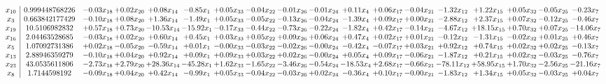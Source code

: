 \documentclass[9pt]{article}
\begin{document}
 \[\begin{array}{c| c c@{\hskip 2pt} c@{\hskip 2pt} c@{\hskip 2pt} c@{\hskip 2pt} c@{\hskip 2pt} c@{\hskip 2pt} c@{\hskip 2pt} c@{\hskip 2pt} c@{\hskip 2pt} c@{\hskip 2pt} c@{\hskip 2pt} c@{\hskip 2pt} c@{\hskip 2pt} c@{\hskip 2pt} c@{\hskip 2pt} c@{\hskip 2pt} }
 x_{10}   &  0.999448768226 & -0.03 x_{18} & +  0.02 x_{20} & +  0.08 x_{14} & -0.85 x_{1} & +  0.05 x_{33} & -0.04 x_{22} & -0.01 x_{26} & -0.01 x_{24} & +  0.11 x_{4} & +  0.06 x_{17} & -0.04 x_{21} & -1.32 x_{12} & +  1.22 x_{15} & +  0.05 x_{32} & -0.05 x_{25} & -0.23 x_{7}\\
 x_{3}   &  0.663842177429 & -0.10 x_{18} & +  0.08 x_{20} & +  1.36 x_{14} & -1.49 x_{1} & +  0.05 x_{33} & -0.05 x_{22} & -0.13 x_{26} & -0.04 x_{24} & -1.39 x_{4} & +  0.09 x_{17} & +  0.00 x_{21} & -2.88 x_{12} & +  2.37 x_{15} & +  0.07 x_{32} & -0.12 x_{25} & -0.46 x_{7}\\
 x_{19}   &  10.5106982832 & +  0.57 x_{18} & +  0.73 x_{20} & -10.53 x_{14} & -15.92 x_{1} & -0.17 x_{33} & -0.44 x_{22} & -0.73 x_{26} & -0.22 x_{24} & -1.82 x_{4} & +  0.42 x_{17} & -0.14 x_{21} & -4.67 x_{12} & + 18.15 x_{15} & +  0.70 x_{32} & +  0.07 x_{25} & -14.06 x_{7}\\
 x_{16}   &  2.04463528685 & -0.03 x_{18} & +  0.02 x_{20} & +  0.60 x_{14} & +  0.45 x_{1} & +  0.03 x_{33} & +  0.05 x_{22} & +  0.09 x_{26} & +  0.06 x_{24} & +  0.47 x_{4} & +  0.02 x_{17} & +  0.01 x_{21} & -0.12 x_{12} & -1.31 x_{15} & -0.02 x_{32} & +  0.01 x_{25} & +  0.46 x_{7}\\
 x_{5}   &  1.07092731386 & +  0.02 x_{18} & -0.05 x_{20} & -0.59 x_{14} & +  0.01 x_{1} & -0.00 x_{33} & -0.03 x_{22} & -0.02 x_{26} & -0.00 x_{24} & -0.42 x_{4} & -0.07 x_{17} & +  0.03 x_{21} & +  0.92 x_{12} & +  0.74 x_{15} & +  0.02 x_{32} & +  0.02 x_{25} & -0.13 x_{7}\\
 x_{13}   &  2.88946359279 & -0.10 x_{18} & +  0.04 x_{20} & +  0.92 x_{14} & +  0.09 x_{1} & +  0.09 x_{33} & +  0.03 x_{22} & +  0.02 x_{26} & -0.00 x_{24} & +  0.05 x_{4} & +  0.09 x_{17} & -0.06 x_{21} & -1.87 x_{12} & +  0.21 x_{15} & +  0.02 x_{32} & -0.03 x_{25} & -0.76 x_{7}\\
 x_{23}   &  43.0535611806 & -2.73 x_{18} & +  2.79 x_{20} & + 28.36 x_{14} & -45.28 x_{1} & +  1.62 x_{33} & -1.65 x_{22} & -3.46 x_{26} & -0.54 x_{24} & -18.53 x_{4} & +  2.68 x_{17} & -0.66 x_{21} & -78.11 x_{12} & + 58.95 x_{15} & +  1.70 x_{32} & -2.56 x_{25} & -21.16 x_{7}\\
 x_{8}   &  1.7144598192 & -0.09 x_{18} & +  0.04 x_{20} & +  0.42 x_{14} & -0.99 x_{1} & +  0.05 x_{33} & -0.04 x_{22} & -0.03 x_{26} & +  0.02 x_{24} & -0.36 x_{4} & +  0.10 x_{17} & -0.00 x_{21} & -1.83 x_{12} & +  1.34 x_{15} & +  0.05 x_{32} & -0.03 x_{25} & +  0.04 x_{7}\\

\end{array}\]
\end{document}
